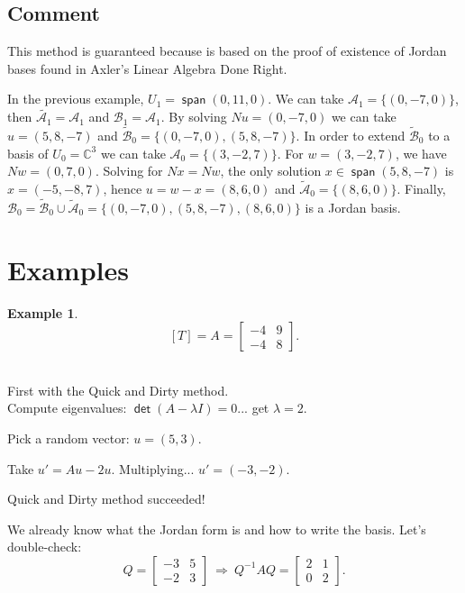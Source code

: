\documentclass[11pt]{article}
\newcommand{\1}{\mathbf{1}}
\newcommand{\0}{\mathbf{0}}
\newcommand{\A}{\mathcal{A}}
\newcommand{\B}{\mathcal{B}}
\newcommand{\C}{\mathbb{C}}
\DeclareMathOperator{\myspan}{\mathsf{span}}
\DeclareMathOperator{\mydet}{\mathsf{det}}
\theoremstyle{definition}
\newtheorem{example}{Example}
\begin{document}
\subsection*{Comment}

This method is guaranteed because is based on the proof of existence of Jordan bases found in Axler's Linear Algebra Done Right.

In the previous example, $U_1 = \myspan(0,11,0)$.
We can take $\A_1 = \{(0,-7,0)\}$, then $\tilde{\A_1}=\A_1$ and $\B_1=\A_1$.
By solving $Nu=(0,-7,0)$ we can take $u=(5,8,-7)$ and $\tilde{\B}_0 = \{(0,-7,0),(5,8,-7)\}$.
In order to extend $\tilde{\B}_0$ to a basis of $U_0 = \C^3$ we can take $\A_0 = \{(3,-2,7)\}$.
For $w=(3,-2,7)$, we have $Nw=(0,7,0)$.
Solving for $Nx = Nw$, the only solution $x \in \myspan(5,8,-7)$ is $x = (-5,-8,7)$, hence $u=w-x=(8,6,0)$ and $\tilde{\A}_0 = \{(8,6,0)\}$.
Finally, $\B_0 = \tilde{\B}_0 \cup \tilde{\A}_0 = \{ (0,-7,0),(5,8,-7),(8,6,0) \}$ is a Jordan basis.



\clearpage

\section*{Examples}

\begin{example}
\[
[T] = A =
\begin{bmatrix}
-4 & 9 \\
-4 & 8
\end{bmatrix}
.
\]
\\
\end{example}

First with the Quick and Dirty method.
\\

Compute eigenvalues: $ \mydet(A-\lambda I)=0 $... get $\lambda=2$.

Pick a random vector: $ u = (5,3) $.

Take $ u' = Au - 2u $.
Multiplying... $u' = (-3,-2)$.

Quick and Dirty method succeeded!

We already know what the Jordan form is and how to write the basis.
Let's double-check:
\[
Q=
\begin{bmatrix}
-3 & 5 \\
-2 & 3
\end{bmatrix}
\
\Longrightarrow
\
Q^{-1}AQ = 
\begin{bmatrix}
2 & 1 \\
0 & 2
\end{bmatrix}
.
\]
\\
\end{document}
